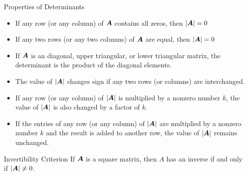 \documentclass{beamer}
\begin{document}
\begin{frame}
\begin{block}{Properties of Determinants}
\begin{itemize}[<+- | alert@+>]
\item If any row (or any column) of $\boldsymbol{A}$ contains all zeros, then ${\left\lvert \boldsymbol{A}\right\rvert}=0$
\item If any two rows (or any two columns) of $\boldsymbol{A}$ are equal, then ${\left\lvert \boldsymbol{A}\right\rvert}=0$
\item If $\boldsymbol{A}$ is an diagonal, upper triangular, or lower triangular matrix, the determinant is the product of the diagonal elements.
\item The value of ${\left\lvert \boldsymbol{A}\right\rvert}$ changes sign if any two rows (or columns) are interchanged.
\item If any row (or any column) of ${\left\lvert \boldsymbol{A}\right\rvert}$ is multiplied by a nonzero number $k$, the value of ${\left\lvert \boldsymbol{A}\right\rvert}$ is also changed by a factor of $k$.
\item If the entries of any row (or any column) of ${\left\lvert \boldsymbol{A}\right\rvert}$ are multiplied by a nonzero number $k$ and the result is added to another row, the value of ${\left\lvert \boldsymbol{A}\right\rvert}$ remains unchanged.
\end{itemize}
\end{block}

\onslide<+->
\begin{block}{Invertibility Criterion}
If $\boldsymbol{A}$ is a square matrix, then $A$ has an inverse if and only if ${\left\lvert \boldsymbol{A}\right\rvert}\neq 0$.
\end{block}
\end{frame}
\end{document}
